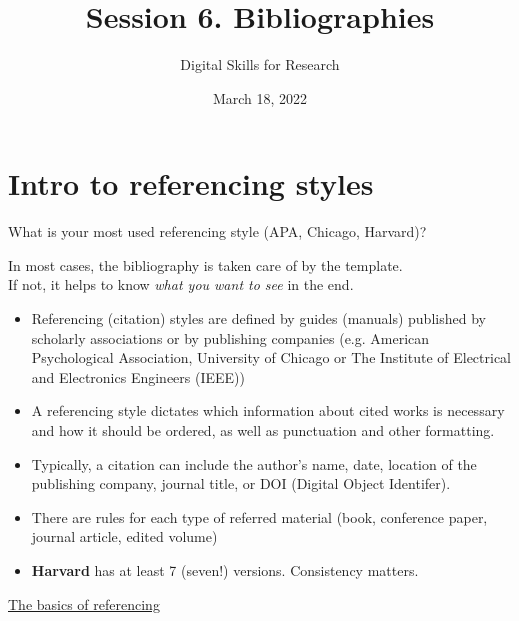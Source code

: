 \documentclass[a4paper,11pt]{article}
\title{Session 6. Bibliographies}
\author{Digital Skills for Research}
\date{March 18, 2022}
\begin{document}
	
\clearpage
\maketitle
\thispagestyle{empty}

\tableofcontents

\section{Intro to referencing styles}

\begin{tcolorbox}[colback=red!5!white, colframe=red!75!black]
	\centering
	{\Large{What is your most used referencing style (APA, Chicago, Harvard)?}}
\end{tcolorbox}
\bigskip
In most cases, the bibliography is taken care of by the template. \\
If not, it helps to know \emph{what you want to see} in the end. 
\bigskip

\begin{itemize}
	\item Referencing (citation) styles are defined by guides (manuals) published by scholarly associations or by publishing companies (e.g. American Psychological Association, University of Chicago or The Institute of Electrical and Electronics Engineers (IEEE))
	\item A referencing style dictates which information about cited works is necessary and how it should be ordered, as well as punctuation and other formatting.
	\item Typically, a citation can include the author's name, date, location of the publishing company, journal title, or DOI (Digital Object Identifer).
	\item There are rules for each type of referred material (book, conference paper, journal article, edited volume)
	\item \textbf{Harvard} has at least 7 (seven!) versions. Consistency matters. 
\end{itemize}

\href{https://www.citethemrightonline.com/Basics}{\underline{The basics of referencing}}

\medskip
\end{document}
